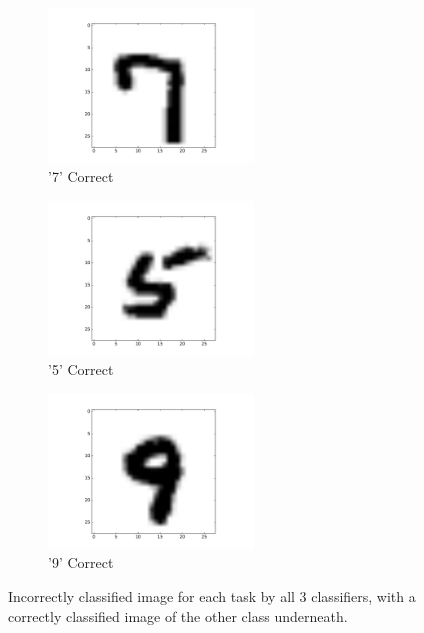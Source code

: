 \documentclass[10pt,psamsfonts]{amsart}
\theoremstyle{definition}
\theoremstyle{remark}
\numberwithin{equation}{section}
\begin{document}
\begin{figure}[b]
\begin{subfigure}[b]{0.25\textwidth}
		\centering
		\includegraphics[width=0.6\textwidth]{hw2_4-1_1v7_ex2.pdf}
		\caption{'7' Correct}
	\end{subfigure}
	\begin{subfigure}[b]{0.25\textwidth}
		\centering
		\includegraphics[width=0.6\textwidth]{hw2_4-1_3v5_ex5.pdf}
		\caption{'5' Correct}
	\end{subfigure}
	\begin{subfigure}[b]{0.25\textwidth}
		\centering
		\includegraphics[width=0.6\textwidth]{hw2_4-1_4v9_ex2.pdf}
		\caption{'9' Correct}
	\end{subfigure}
	\caption{Incorrectly classified image for each task by all 3 classifiers, with a correctly classified image of the other class underneath.}
\end{figure}
\end{document}
